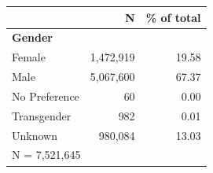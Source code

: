\begin{tabular}{lrr}
\toprule
 & N & \% of total \\
\midrule
\multicolumn{3}{l}{\textbf{Gender}}\\ 
\midrule
Female              &   1,472,919&       19.58\\
Male                &   5,067,600&       67.37\\
No Preference       &          60&        0.00\\
Transgender         &         982&        0.01\\
Unknown             &     980,084&       13.03\\
\midrule
\multicolumn{3}{l}{\footnotesize N =    7,521,645}\\
\bottomrule
\end{tabular}
